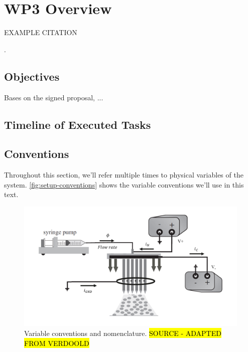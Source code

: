 \documentclass[oneside,12pt]{article}
\begin{document}
\setlength{\parindent}{0 em}  %
\setlength{\parskip}{0.7 em}    %

\newpage    \pagestyle{empty}
\tableofcontents
\pagestyle{fancy}
\newpage

\section{WP3 Overview}

EXAMPLE CITATION

 \citep{Carrasco-Munoz2022}. %

\subsection{Objectives}

Bases on the signed proposal, ... 

\subsection{Timeline of Executed Tasks}

\subsection{Conventions}

Throughout this section, we'll refer multiple times to physical variables of the system. \autoref{fig:setup-conventions}
shows the variable conventions we'll use in this text.

\begin{figure}[h!]
    \centering
    \includegraphics[width=.9\textwidth,trim=1 1 1 1,clip]{figures/setup-conventions.png}
    \caption{Variable conventions and nomenclature. \hl{SOURCE - ADAPTED FROM VERDOOLD}}
    \label{fig:setup-conventions}
\end{figure}
\end{document}
